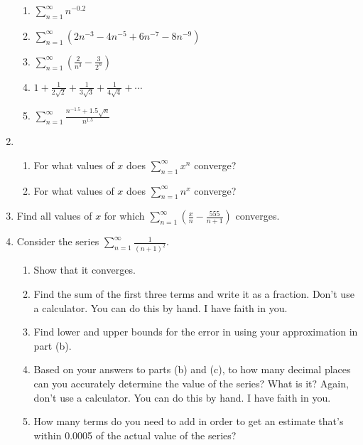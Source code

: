 \documentclass[11pt]{article}
\begin{document}
\begin{enumerate}
\begin{enumerate}
    \item $\displaystyle \sum_{n=1}^\infty n^{-0.2}$

    \item $\displaystyle \sum_{n=1}^\infty
    \left( 2n^{-3} - 4n^{-5} + 6n^{-7} - 8n^{-9} \right)$

    \item $\displaystyle \sum_{n=1}^\infty
    \left( \frac2{n^3} - \frac3{2^n} \right)$

    \item $\displaystyle 
    1 + \frac1{2\sqrt2} + \frac1{3\sqrt3} + \frac1{4\sqrt4} + \cdots$

    \item $\displaystyle \sum_{n=1}^\infty
    \frac{n^{-1.5}+1.5\sqrt n}{n^{1.5}}$

  \end{enumerate}

  \item \begin{enumerate}
    \item For what values of $x$ does $\displaystyle \sum_{n=1}^\infty x^n$
    converge?
    \item For what values of $x$ does $\displaystyle \sum_{n=1}^\infty n^x$
    converge?
  \end{enumerate}

  \item Find all values of $x$ for which $\displaystyle \sum_{n=1}^\infty \left(
  \frac xn - \frac{555}{n+1} \right)$ converges.

  \item Consider the series $\displaystyle \sum_{n=1}^\infty \frac1{(n+1)^2}$.
  \begin{enumerate}
    
    \item Show that it converges.

    \item Find the sum of the first three terms and write it as a fraction.
    Don't use a calculator. You can do this by hand. I have faith in you.

    \item Find lower and upper bounds for the error in using your approximation
    in part (b).
    
    \item Based on your answers to parts (b) and (c), to how many decimal places
    can you accurately determine the value of the series? What is it? Again,
    don't use a calculator. You can do this by hand. I have faith in you.

    \item How many terms do you need to add in order to get an estimate that's
    within 0.0005 of the actual value of the series?

  \end{enumerate}

\end{enumerate}
\end{document}
